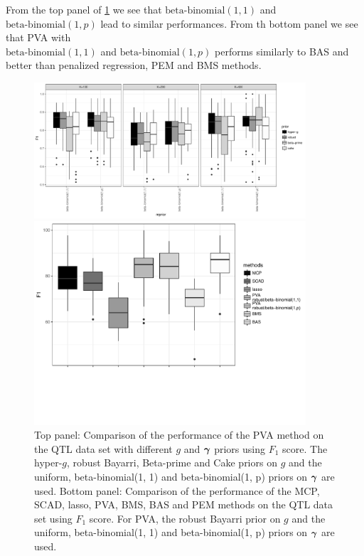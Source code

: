 From the top panel of \ref{fig:qtlPVA_F1_compare} we see that 
$\text{beta-binomial}(1, 1)$
and   $\text{beta-binomial}(1, p)$
lead to similar performances.
From th bottom panel we see that PVA
with \\ $\text{beta-binomial}(1, 1)$
and   $\text{beta-binomial}(1, p)$
performs similarly to BAS 
and better than penalized regression, PEM 
and BMS methods.

\begin{figure}[p!]
	\begin{center}	
		\includegraphics[width=0.9\textwidth]{./qtlPVA_F1.pdf}  
		
		\includegraphics[trim={0 4cm 0 0},width=0.9\textwidth]{./qtlPVA_F1_compare_edit.pdf}  
	\end{center}
	\caption{Top panel: Comparison of the performance of the PVA method on the
						QTL data set with different $g$ and ${\boldsymbol \gamma}$ priors using $F_1$ score.
						The hyper-$g$,
						robust Bayarri, Beta-prime and Cake priors on $g$ and the uniform, beta-binomial(1, 1) and beta-binomial(1, p) priors on ${\boldsymbol \gamma}$ are used.
Bottom panel: Comparison of the performance of the MCP, SCAD, lasso, PVA, BMS, BAS and PEM methods on the
						QTL data set using $F_1$ score. For PVA, the
						robust Bayarri prior on $g$ and the uniform, beta-binomial(1, 1) and beta-binomial(1, p) priors
						on ${\boldsymbol \gamma}$ are used.}
	\label{fig:qtlPVA_F1_compare}
\end{figure}


